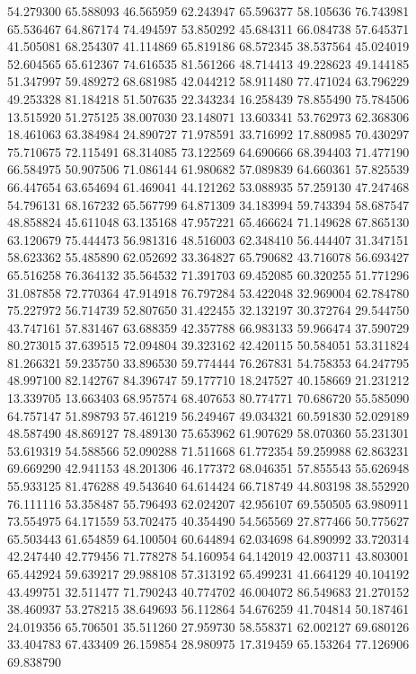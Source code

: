 54.279300
65.588093
46.565959
62.243947
65.596377
58.105636
76.743981
65.536467
64.867174
74.494597
53.850292
45.684311
66.084738
57.645371
41.505081
68.254307
41.114869
65.819186
68.572345
38.537564
45.024019
52.604565
65.612367
74.616535
81.561266
48.714413
49.228623
49.144185
51.347997
59.489272
68.681985
42.044212
58.911480
77.471024
63.796229
49.253328
81.184218
51.507635
22.343234
16.258439
78.855490
75.784506
13.515920
51.275125
38.007030
23.148071
13.603341
53.762973
62.368306
18.461063
63.384984
24.890727
71.978591
33.716992
17.880985
70.430297
75.710675
72.115491
68.314085
73.122569
64.690666
68.394403
71.477190
66.584975
50.907506
71.086144
61.980682
57.089839
64.660361
57.825539
66.447654
63.654694
61.469041
44.121262
53.088935
57.259130
47.247468
54.796131
68.167232
65.567799
64.871309
34.183994
59.743394
58.687547
48.858824
45.611048
63.135168
47.957221
65.466624
71.149628
67.865130
63.120679
75.444473
56.981316
48.516003
62.348410
56.444407
31.347151
58.623362
55.485890
62.052692
33.364827
65.790682
43.716078
56.693427
65.516258
76.364132
35.564532
71.391703
69.452085
60.320255
51.771296
31.087858
72.770364
47.914918
76.797284
53.422048
32.969004
62.784780
75.227972
56.714739
52.807650
31.422455
32.132197
30.372764
29.544750
43.747161
57.831467
63.688359
42.357788
66.983133
59.966474
37.590729
80.273015
37.639515
72.094804
39.323162
42.420115
50.584051
53.311824
81.266321
59.235750
33.896530
59.774444
76.267831
54.758353
64.247795
48.997100
82.142767
84.396747
59.177710
18.247527
40.158669
21.231212
13.339705
13.663403
68.957574
68.407653
80.774771
70.686720
55.585090
64.757147
51.898793
57.461219
56.249467
49.034321
60.591830
52.029189
48.587490
48.869127
78.489130
75.653962
61.907629
58.070360
55.231301
53.619319
54.588566
52.090288
71.511668
61.772354
59.259988
62.863231
69.669290
42.941153
48.201306
46.177372
68.046351
57.855543
55.626948
55.933125
81.476288
49.543640
64.614424
66.718749
44.803198
38.552920
76.111116
53.358487
55.796493
62.024207
42.956107
69.550505
63.980911
73.554975
64.171559
53.702475
40.354490
54.565569
27.877466
50.775627
65.503443
61.654859
64.100504
60.644894
62.034698
64.890992
33.720314
42.247440
42.779456
71.778278
54.160954
64.142019
42.003711
43.803001
65.442924
59.639217
29.988108
57.313192
65.499231
41.664129
40.104192
43.499751
32.511477
71.790243
40.774702
46.004072
86.549683
21.270152
38.460937
53.278215
38.649693
56.112864
54.676259
41.704814
50.187461
24.019356
65.706501
35.511260
27.959730
58.558371
62.002127
69.680126
33.404783
67.433409
26.159854
28.980975
17.319459
65.153264
77.126906
69.838790
